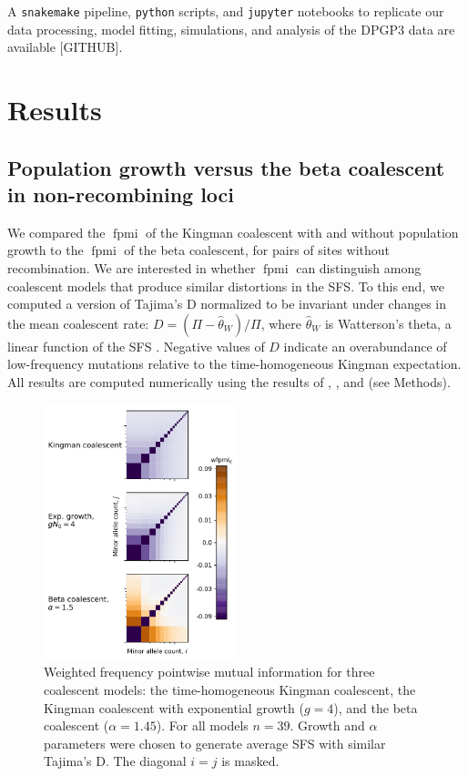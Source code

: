 \documentclass[11pt, letterpaper]{article}   	%
\DeclareMathOperator{\fpmi}{fpmi}
\begin{document}
A \texttt{snakemake} pipeline, \texttt{python} scripts, and \texttt{jupyter} notebooks to replicate our data processing, model fitting, simulations, and analysis of the DPGP3 data are available [GITHUB].

\section*{Results \label{sec:results}}

\subsection*{Population growth versus the beta coalescent in non-recombining loci}

We compared the $\fpmi$ of the Kingman coalescent with and without population growth to the $\fpmi$ of the beta coalescent, for pairs of sites without recombination.
We are interested in whether $\fpmi$ can distinguish among coalescent models that produce similar distortions in the SFS.
To this end, we computed a version of Tajima's D \autocite{Tajima1983} normalized to be invariant under changes in the mean coalescent rate: $D = (\Pi - \hat{\theta}_W) / \Pi$, where $\hat{\theta}_W$ is Watterson's theta, a linear function of the SFS \autocite{Watterson19??}.
Negative values of $D$ indicate an overabundance of low-frequency mutations relative to the time-homogeneous Kingman expectation.
All results are computed numerically using the results of \cite{Fu1995}, \cite{ZivkovicWiehe2008}, and \cite{BirknerEtAl2013} (see Methods).

\begin{figure}
\centering
\includegraphics[width=0.5\textwidth]{figures/wfpmi_no_recombination.pdf}
\caption{Weighted frequency pointwise mutual information for three coalescent models: the time-homogeneous Kingman coalescent, the Kingman coalescent with exponential growth ($g=4$), and the beta coalescent ($\alpha=1.45$). For all models $n=39$. Growth and $\alpha$ parameters were chosen to generate average SFS with similar Tajima's D. The diagonal $i=j$ is masked. \label{fig:nonrecombining_pmi}}
\end{figure}
\end{document}
